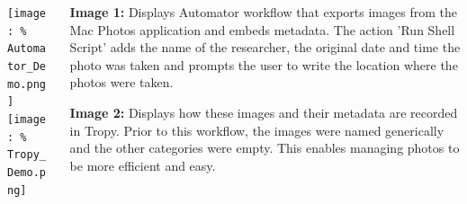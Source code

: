 \documentclass[unknownkeysallowed,usepdftitle=false, parskip=full]{beamer}
\newcommand{\secvariable}{nothing}
\newcommand{\mysection}[1]{\renewcommand{\secvariable}{#1}
}
\begin{document}
\begin{frame}\label{\secvariable}
  \begin{columns}[t]
  \begin{column}[c]{0.45\textwidth}
\texttt{[image: \%
Automator\_Demo.png]}\\
\vspace{12pt}
\texttt{[image: \%
Tropy\_Demo.png]}
    \end{column}
    \begin{column}[c]{0.50\textwidth}
    \parbox{\linewidth}{
      
  
 \textbf{Image 1:} Displays Automator workflow that exports images from the Mac Photos application and embeds metadata. The action 'Run Shell Script' adds the name of the researcher, the original date and time the photo was taken and prompts the user to write the location where the photos were taken. 
\vspace{8pt}

\textbf{Image 2:} Displays how these images and their metadata are recorded in Tropy. Prior to this workflow, the images were named generically and the other categories were empty. This enables managing photos to be more efficient and easy.
             
 
   
      }
    \end{column}
    
  \end{columns}

  
\end{frame}
\mysection{radar}
\end{document}
